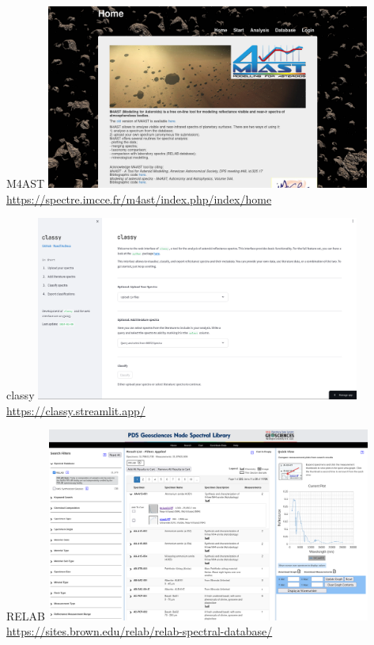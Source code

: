 \begin{frame}[t]{M4AST}
  \includegraphics[width=0.8\textwidth]{gfx/demo_m4ast}
  \url{https://spectre.imcce.fr/m4ast/index.php/index/home}
\end{frame}

\begin{frame}[t]{classy}
  \includegraphics[width=0.8\textwidth]{gfx/demo_classy}
  \url{https://classy.streamlit.app/}
\end{frame}

\begin{frame}[t]{RELAB}
  \includegraphics[width=0.8\textwidth]{gfx/demo_relab}
  \url{https://sites.brown.edu/relab/relab-spectral-database/}
\end{frame}

